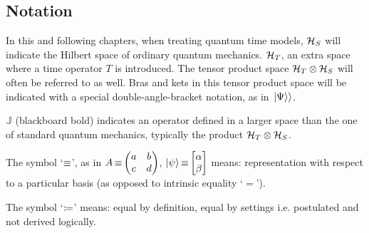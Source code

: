 
\subsection*{Notation}

In this and following chapters, when treating quantum time models,
$\mathcal{H}_S$ will indicate the Hilbert space of ordinary quantum mechanics.
$\mathcal{H}_T$, an extra space where a time operator ${T}$ is introduced. The tensor
product space $\mathcal{H}_T \otimes \mathcal{H}_S$
will often be referred to as well.
Bras and kets in this tensor product space will be indicated with a special double-angle-bracket
notation, as in $\left.\left| \Psi \right\rangle\right\rangle$.

${\mathbb{J}}$ (blackboard bold) indicates an  operator defined in
a larger space than the one of standard quantum mechanics,
typically the product $\mathcal{H}_T \otimes \mathcal{H}_S$.

The symbol `$\operatorname*{\equiv}$', as in $\op{A} \repr \mqty(a&b\\c&d)$, $\ket{\psi} \repr \mqty[\alpha \\ \beta]$
means: representation with respect to a particular basis (as opposed to intrinsic equality `$=$').

The symbol `$\coloneqq$'
means: equal by definition, equal by settings i.e. postulated and not derived logically.
